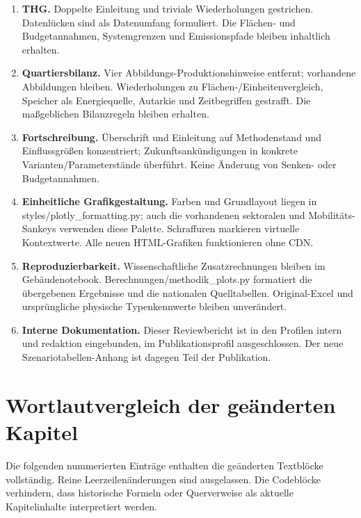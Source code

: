 \documentclass[
  ngerman,
  a4paper,
  DIV=11]{scrreprt}
\begin{document}
\begin{enumerate}
  „Tabelle ergänzen`` durch den dokumentierten Parameterstand ersetzt.
  Vorhandene historische Gutschriften werden weiterhin als historische
  Werte eingeordnet.
\item
  \textbf{THG.} Doppelte Einleitung und triviale Wiederholungen
  gestrichen. Datenlücken sind als Datenumfang formuliert. Die Flächen-
  und Budgetannahmen, Systemgrenzen und Emissionspfade bleiben
  inhaltlich erhalten.
\item
  \textbf{Quartiersbilanz.} Vier Abbildungs-Produktionshinweise
  entfernt; vorhandene Abbildungen bleiben. Wiederholungen zu
  Flächen-/Einheitenvergleich, Speicher als Energiequelle, Autarkie und
  Zeitbegriffen gestrafft. Die maßgeblichen Bilanzregeln bleiben
  erhalten.
\item
  \textbf{Fortschreibung.} Überschrift und Einleitung auf Methodenstand
  und Einflussgrößen konzentriert; Zukunftsankündigungen in konkrete
  Varianten/Parameterstände überführt. Keine Änderung von Senken- oder
  Budgetannahmen.
\item
  \textbf{Einheitliche Grafikgestaltung.} Farben und Grundlayout liegen
  in styles/plotly\_formatting.py; auch die vorhandenen sektoralen und
  Mobilitäts-Sankeys verwenden diese Palette. Schraffuren markieren
  virtuelle Kontextwerte. Alle neuen HTML-Grafiken funktionieren ohne
  CDN.
\item
  \textbf{Reproduzierbarkeit.} Wissenschaftliche Zusatzrechnungen
  bleiben im Gebäudenotebook. Berechnungen/methodik\_plots.py formatiert
  die übergebenen Ergebnisse und die nationalen Quelltabellen.
  Original-Excel und ursprüngliche physische Typenkennwerte bleiben
  unverändert.
\item
  \textbf{Interne Dokumentation.} Dieser Reviewbericht ist in den
  Profilen intern und redaktion eingebunden, im Publikationsprofil
  ausgeschlossen. Der neue Szenariotabellen-Anhang ist dagegen Teil der
  Publikation.
\end{enumerate}

\section{Wortlautvergleich der geänderten
Kapitel}\label{wortlautvergleich-der-geuxe4nderten-kapitel}

Die folgenden nummerierten Einträge enthalten die geänderten Textblöcke
vollständig. Reine Leerzeilenänderungen sind ausgelassen. Die Codeblöcke
verhindern, dass historische Formeln oder Querverweise als aktuelle
Kapitelinhalte interpretiert werden.
\end{document}
